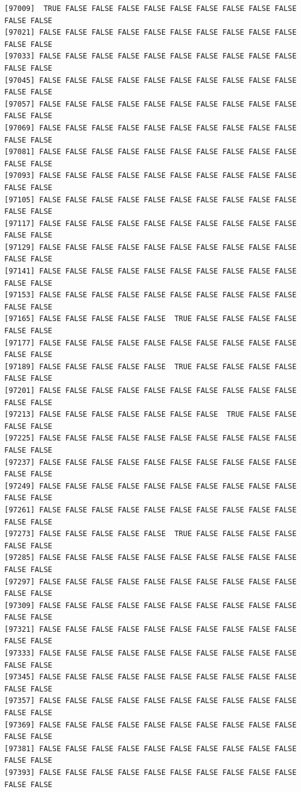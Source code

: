 \documentclass[
  a4paper,
  DIV=11,
  numbers=noendperiod]{scrartcl}
\begin{document}
\begin{verbatim}
[97009]  TRUE FALSE FALSE FALSE FALSE FALSE FALSE FALSE FALSE FALSE FALSE FALSE
[97021] FALSE FALSE FALSE FALSE FALSE FALSE FALSE FALSE FALSE FALSE FALSE FALSE
[97033] FALSE FALSE FALSE FALSE FALSE FALSE FALSE FALSE FALSE FALSE FALSE FALSE
[97045] FALSE FALSE FALSE FALSE FALSE FALSE FALSE FALSE FALSE FALSE FALSE FALSE
[97057] FALSE FALSE FALSE FALSE FALSE FALSE FALSE FALSE FALSE FALSE FALSE FALSE
[97069] FALSE FALSE FALSE FALSE FALSE FALSE FALSE FALSE FALSE FALSE FALSE FALSE
[97081] FALSE FALSE FALSE FALSE FALSE FALSE FALSE FALSE FALSE FALSE FALSE FALSE
[97093] FALSE FALSE FALSE FALSE FALSE FALSE FALSE FALSE FALSE FALSE FALSE FALSE
[97105] FALSE FALSE FALSE FALSE FALSE FALSE FALSE FALSE FALSE FALSE FALSE FALSE
[97117] FALSE FALSE FALSE FALSE FALSE FALSE FALSE FALSE FALSE FALSE FALSE FALSE
[97129] FALSE FALSE FALSE FALSE FALSE FALSE FALSE FALSE FALSE FALSE FALSE FALSE
[97141] FALSE FALSE FALSE FALSE FALSE FALSE FALSE FALSE FALSE FALSE FALSE FALSE
[97153] FALSE FALSE FALSE FALSE FALSE FALSE FALSE FALSE FALSE FALSE FALSE FALSE
[97165] FALSE FALSE FALSE FALSE FALSE  TRUE FALSE FALSE FALSE FALSE FALSE FALSE
[97177] FALSE FALSE FALSE FALSE FALSE FALSE FALSE FALSE FALSE FALSE FALSE FALSE
[97189] FALSE FALSE FALSE FALSE FALSE  TRUE FALSE FALSE FALSE FALSE FALSE FALSE
[97201] FALSE FALSE FALSE FALSE FALSE FALSE FALSE FALSE FALSE FALSE FALSE FALSE
[97213] FALSE FALSE FALSE FALSE FALSE FALSE FALSE  TRUE FALSE FALSE FALSE FALSE
[97225] FALSE FALSE FALSE FALSE FALSE FALSE FALSE FALSE FALSE FALSE FALSE FALSE
[97237] FALSE FALSE FALSE FALSE FALSE FALSE FALSE FALSE FALSE FALSE FALSE FALSE
[97249] FALSE FALSE FALSE FALSE FALSE FALSE FALSE FALSE FALSE FALSE FALSE FALSE
[97261] FALSE FALSE FALSE FALSE FALSE FALSE FALSE FALSE FALSE FALSE FALSE FALSE
[97273] FALSE FALSE FALSE FALSE FALSE  TRUE FALSE FALSE FALSE FALSE FALSE FALSE
[97285] FALSE FALSE FALSE FALSE FALSE FALSE FALSE FALSE FALSE FALSE FALSE FALSE
[97297] FALSE FALSE FALSE FALSE FALSE FALSE FALSE FALSE FALSE FALSE FALSE FALSE
[97309] FALSE FALSE FALSE FALSE FALSE FALSE FALSE FALSE FALSE FALSE FALSE FALSE
[97321] FALSE FALSE FALSE FALSE FALSE FALSE FALSE FALSE FALSE FALSE FALSE FALSE
[97333] FALSE FALSE FALSE FALSE FALSE FALSE FALSE FALSE FALSE FALSE FALSE FALSE
[97345] FALSE FALSE FALSE FALSE FALSE FALSE FALSE FALSE FALSE FALSE FALSE FALSE
[97357] FALSE FALSE FALSE FALSE FALSE FALSE FALSE FALSE FALSE FALSE FALSE FALSE
[97369] FALSE FALSE FALSE FALSE FALSE FALSE FALSE FALSE FALSE FALSE FALSE FALSE
[97381] FALSE FALSE FALSE FALSE FALSE FALSE FALSE FALSE FALSE FALSE FALSE FALSE
[97393] FALSE FALSE FALSE FALSE FALSE FALSE FALSE FALSE FALSE FALSE FALSE FALSE

\end{verbatim}
\end{document}

